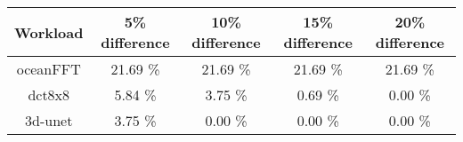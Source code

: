 \begin{tabular}{|c|c|c|c|c|}
\hline
  \textbf{Workload} & \textbf{5\% difference} & \textbf{10\% difference} & \textbf{15\% difference} & \textbf{20\% difference}\\
\hline
\hline
  oceanFFT & 21.69 \% & 21.69 \% & 21.69 \% & 21.69 \%\\
  dct8x8 & 5.84 \% & 3.75 \% & 0.69 \% & 0.00 \%\\
  3d-unet & 3.75 \% & 0.00 \% & 0.00 \% & 0.00 \%\\
\hline
\end{tabular}
